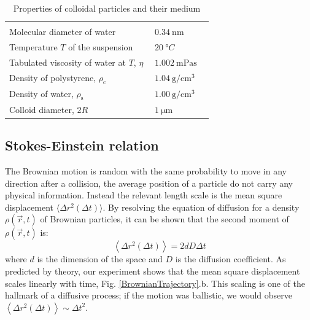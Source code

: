 \documentclass[%
 aip,
 jmp,%
 amsmath,amssymb,
reprint,%
]{revtex4-1}
\begin{document}
\begin{table}
\begin{tabular}{m{0.7\linewidth}m{0.28\linewidth}}
  \hline\\[-0.8em]
  Molecular diameter of water \citep{17_marcus1998properties}  & $\SI{0.34}{\nano\meter}$\\
  Temperature $T$ of the suspension & $\SI{20}{\degree C}$ \\
  Tabulated viscosity of water at $T$, $\eta$ & $\SI{1.002}{\milli\pascal\second}$ \\
  Density of polystyrene, $\rho_\text{c}$ & $\SI{1.04}{\gram\per\centi\meter\cubed}$ \\
  Density of water, $\rho_\text{s}$ & $\SI{1.00}{\gram\per\centi\meter\cubed}$ \\ 
  Colloid diameter, $2R$ & $\SI{1}{\micro\meter}$\\
  \hline
  \end{tabular}
  \caption{Properties of colloidal particles and their medium}
  \label{TabParams}
\end{table}

\subsection{Stokes-Einstein relation}

The Brownian motion is random with the same probability to move in any direction after a collision, the average position of a particle do not carry any physical information. Instead the relevant length scale is the mean square displacement \citep{11_ken2003molecular} $\langle \Delta r^2(\Delta t) \rangle$. By resolving the equation of diffusion for a density $\rho(\vec{r}, t)$ of Brownian particles, it can be shown \cite{9_einstein1906theory} that the second moment of $\rho(\vec{r}, t)$ is:
\begin{equation}
\left\langle \Delta r^2(\Delta t) \right\rangle = 2dD \Delta t
\label{eq:msd}
\end{equation}
where $d$ is the dimension of the space and $D$ is the diffusion coefficient. As predicted by theory, our experiment \cite{Maurer2014} shows that the mean square displacement scales linearly with time, Fig. \ref{BrownianTrajectory}.b. This scaling is one of the hallmark of a diffusive process; if the motion was ballistic, we would observe $\left\langle \Delta r^2(\Delta t) \right\rangle \sim \Delta t^2$.
\end{document}
